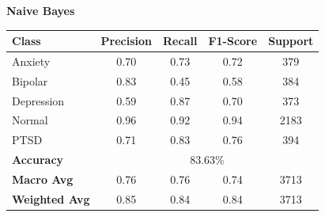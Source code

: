 \begin{center}
    \textbf{Naive Bayes} \\[0.2em]
    \begin{tabular}{|l|c|c|c|c|}
        \hline
        \textbf{Class} & \textbf{Precision} & \textbf{Recall} & \textbf{F1-Score} & \textbf{Support} \\ \hline
        Anxiety        & 0.70               & 0.73            & 0.72              & 379              \\ \hline
        Bipolar        & 0.83               & 0.45            & 0.58              & 384              \\ \hline
        Depression     & 0.59               & 0.87            & 0.70              & 373              \\ \hline
        Normal         & 0.96               & 0.92            & 0.94              & 2183             \\ \hline
        PTSD           & 0.71               & 0.83            & 0.76              & 394              \\ \hline
        \textbf{Accuracy} & \multicolumn{4}{|c|}{83.63\%} \\ \hline
        \textbf{Macro Avg} & 0.76            & 0.76            & 0.74              & 3713             \\ \hline
        \textbf{Weighted Avg} & 0.85         & 0.84            & 0.84              & 3713             \\ \hline
    \end{tabular}
\end{center}


